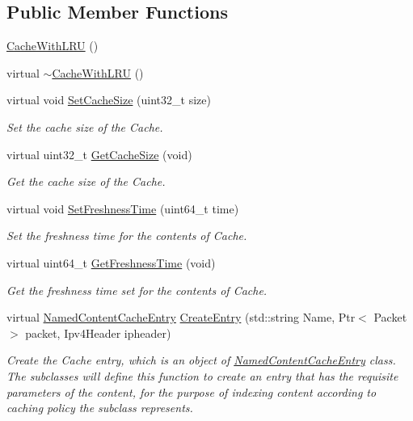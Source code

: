 \subsection*{Public Member Functions}
\begin{DoxyCompactItemize}
\item 
\hyperlink{classns3_1_1CacheWithLRU_ad16e5fd5c30972ad02742b2b60d6f108}{Cache\-With\-L\-R\-U} ()
\item 
virtual \hyperlink{classns3_1_1CacheWithLRU_a7d21d57b377db88ba971fd324194e150}{$\sim$\-Cache\-With\-L\-R\-U} ()
\item 
virtual void \hyperlink{classns3_1_1CacheWithLRU_a75323b8c1d45dbaa19e07bf6fdf9b9a3}{Set\-Cache\-Size} (uint32\-\_\-t size)
\begin{DoxyCompactList}\small\item\em Set the cache size of the Cache. \end{DoxyCompactList}\item 
virtual uint32\-\_\-t \hyperlink{classns3_1_1CacheWithLRU_a7011075202d46dc23358058ed8037125}{Get\-Cache\-Size} (void)
\begin{DoxyCompactList}\small\item\em Get the cache size of the Cache. \end{DoxyCompactList}\item 
virtual void \hyperlink{classns3_1_1CacheWithLRU_a0f9e4e62cf6dee79d05774b25ee398c5}{Set\-Freshness\-Time} (uint64\-\_\-t time)
\begin{DoxyCompactList}\small\item\em Set the freshness time for the contents of Cache. \end{DoxyCompactList}\item 
virtual uint64\-\_\-t \hyperlink{classns3_1_1CacheWithLRU_ad3f0a3b34a506792f30310761242a86c}{Get\-Freshness\-Time} (void)
\begin{DoxyCompactList}\small\item\em Get the freshness time set for the contents of Cache. \end{DoxyCompactList}\item 
virtual \hyperlink{classns3_1_1NamedContentCacheEntry}{Named\-Content\-Cache\-Entry} \hyperlink{classns3_1_1CacheWithLRU_a8dc721b8593047e5246b3ffa21c83ba2}{Create\-Entry} (std\-::string Name, Ptr$<$ Packet $>$ packet, Ipv4\-Header ipheader)
\begin{DoxyCompactList}\small\item\em Create the Cache entry, which is an object of \hyperlink{classns3_1_1NamedContentCacheEntry}{Named\-Content\-Cache\-Entry} class. The subclasses will define this function to create an entry that has the requisite parameters of the content, for the purpose of indexing content according to caching policy the subclass represents. \end{DoxyCompactList}\item 

\end{DoxyCompactItemize}
